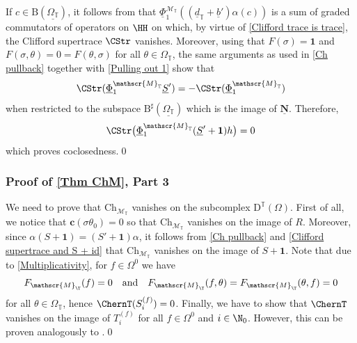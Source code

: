 \documentclass[a4paper, english, 12pt, bibliography=totocnumbered,
index=totoc]{scrartcl}
\begin{document}
If $c \in \mathrm{B}(\underline{\Omega_{\mathbb{T}}})$, it follows from
\cite[Theorem 4.7]{GüneysuLudewig}
that $\underline{\Phi}_1^{\mathscr{M}_{\mathbb{T}}}
\left((\underline{d}_{\mathbb{T}} + \underline{b}')\alpha(c)\right)$ is a
sum of graded commutators of operators on $\HH$ on which, by virtue of
\cref{Clifford trace is trace}, the Clifford supertrace $\CStr$ vanishes.
Moreover, using that $F(\sigma) = \mathbf{1}$ and $F(\sigma, \theta) = 0
= F(\theta,
\sigma)$ for all $\theta \in \Omega_{\mathbb{T}}$, the same arguments
as used in \cref{Ch pullback} together with \cref{Pulling out 1} show that
\begin{equation}\label{Clifford supertrace and S + id}
	\CStr(
	\underline{\Phi}_1^{\mathscr{M}_{\mathbb{T}}}\underline{S}') =
	-
	\CStr(\underline{\Phi}_1^{\mathscr{M}_{\mathbb{T}}})
\end{equation}
when restricted to the subspace
$\mathrm{B}^{\sharp}(\underline{\Omega_{\mathbb{T}}})$ which is the image of
$\underline{\mathbf{N}}$.
Therefore,
\begin{equation*}
	\CStr\big(
	\underline{\Phi}_1^{\mathscr{M}_{\mathbb{T}}} (\underline{S}' +
	\mathbf{1})h\big) = 0
\end{equation*}
which proves coclosedness.\qed
\subsubsection{Proof of \texorpdfstring{\cref{Thm ChM}}{Theorem 5.10}, Part 3}
We need to prove that $\mathrm{Ch}_{\mathscr{M}_{\mathbb{T}}}$ vanishes on
the subcomplex $\mathrm{D}^{\mathbb{T}}(\Omega)$.
First of all, we notice that $\mathbf{c}(\sigma \theta_0) = 0$ so
that $\mathrm{Ch}_{\mathscr{M}_{\mathbb{T}}}$ vanishes on the image of $R$.
Moreover, since $\alpha(S + \mathbf{1}) = (S' + \mathbf{1})
\alpha$, it follows from \cref{Ch pullback} and \cref{Clifford supertrace
	and S + id} that $\mathrm{Ch}_{\mathscr{M}_{\mathbb{T}}}$ vanishes on the
image of $S + \mathbf{1}$.
Note that due to \cref{Multiplicativity}, for $f \in \Omega^0$ we have
\begin{equation*}
	F_{\mathscr{M}_\T}(f) = 0 \quad \text{and} \quad F_{\mathscr{M}_\T}(f,
	\theta) = F_{\mathscr{M}_\T}(\theta, f) = 0
\end{equation*}
for all $\theta \in \Omega_{\mathbb{T}}$, hence $\ChernT(S_i^{(f)}) = 0$.
Finally, we have to show that $\ChernT$ vanishes on the image of
$T_i^{(f)}$ for all $f \in \Omega^0$ and $i \in \N_0$.
However, this can be proven analogously to \cite[Theorem
5.6]{GüneysuLudewig}.\qed
\end{document}
